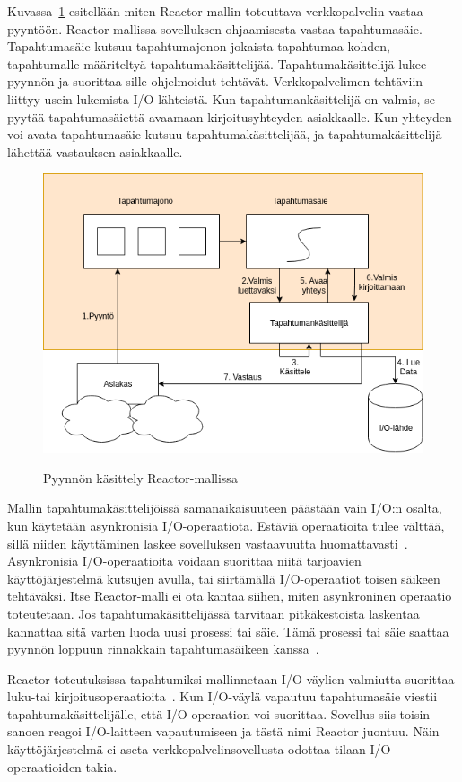 \documentclass[finnish]{tktltiki2}%
\theoremstyle{definition}
\theoremstyle{remark}
\begin{document}
Kuvassa~\ref{fig:reactor} esitellään miten Reactor-mallin toteuttava verkkopalvelin
vastaa pyyntöön.
Reactor mallissa sovelluksen ohjaamisesta vastaa tapahtumasäie.
Tapahtumasäie kutsuu tapahtumajonon jokaista tapahtumaa kohden, tapahtumalle
määriteltyä tapahtumakäsittelijää. Tapahtumakäsittelijä
lukee pyynnön ja suorittaa sille ohjelmoidut tehtävät. Verkkopalvelimen
tehtäviin liittyy usein lukemista I/O-lähteistä.
Kun tapahtumankäsittelijä on valmis, se pyytää tapahtumasäiettä
avaamaan kirjoitusyhteyden asiakkaalle. Kun yhteyden voi avata
tapahtumasäie kutsuu tapahtumakäsittelijää, ja tapahtumakäsittelijä lähettää vastauksen
asiakkaalle.
\begin{figure}
  \centering
  \caption{Pyynnön käsittely Reactor-mallissa}
  \includegraphics[scale=0.5]{reactor.png}\label{fig:reactor}
\end{figure}

Mallin tapahtumakäsittelijöissä samanaikaisuuteen päästään
vain I/O:n osalta, kun käytetään asynkronisia
I/O-operaatiota.
Estäviä operaatioita tulee välttää,
sillä niiden käyttäminen laskee sovelluksen
vastaavuutta huomattavasti~\cite{schmidt_reactor:_1995}.
Asynkronisia I/O-operaatioita
voidaan suorittaa niitä tarjoavien käyttöjärjestelmä kutsujen
avulla, tai siirtämällä I/O-operaatiot toisen säikeen tehtäväksi.
Itse Reactor-malli ei ota kantaa siihen, miten asynkroninen operaatio toteutetaan.
Jos tapahtumakäsittelijässä tarvitaan pitkäkestoista laskentaa
kannattaa sitä varten luoda uusi prosessi tai säie. Tämä
prosessi tai säie saattaa pyynnön loppuun rinnakkain
tapahtumasäikeen kanssa~\cite{schmidt_reactor:_1995}.

Reactor-toteutuksissa tapahtumiksi mallinnetaan I/O-väylien
valmiutta suorittaa luku-tai kirjoitusoperaatioita~\cite{schmidt_reactor:_1995}.
Kun I/O-väylä
vapautuu tapahtumasäie viestii tapahtumakäsittelijälle, että 
I/O-operaation voi suorittaa. Sovellus siis toisin sanoen
reagoi I/O-laitteen vapautumiseen ja tästä nimi Reactor juontuu.
Näin käyttöjärjestelmä ei aseta
verkkopalvelinsovellusta odottaa tilaan I/O-operaatioiden takia.
\end{document}
